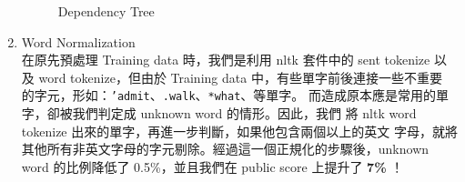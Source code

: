 \documentclass[12pt, a4paper]{article}
\theoremstyle{mystyle}	%
\begin{document}
\begin{enumerate}
\begin{figure}[!h]
      \caption{Dependency Tree}
      \label{fig:dt}
    \end{figure}
  \item Word Normalization\\
    在原先預處理 Training data 時，我們是利用 nltk 套件中的 sent tokenize
    以及 word tokenize，但由於 Training data 中，有些單字前後連接一些不重要
    的字元，形如：\texttt{'admit}、\texttt{.walk}、\texttt{*what}、等單字。
    而造成原本應是常用的單字，卻被我們判定成 unknown word 的情形。因此，我們
    將 nltk word tokenize 出來的單字，再進一步判斷，如果他包含兩個以上的英文
    字母，就將其他所有非英文字母的字元剔除。經過這一個正規化的步驟後，unknown
    word 的比例降低了 0.5\%，並且我們在 public score 上提升了 \textbf{7\%} ！
\end{enumerate}
\end{document}
